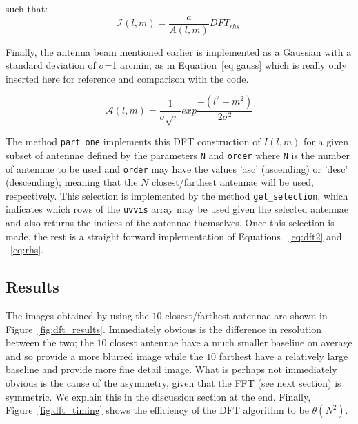 \documentclass[11pt,letterpaper]{article}
\begin{document}
such that:
\begin{equation}\label{eq:dft2}
\mathcal{I}(l,m)= \frac{a}{A(l,m)} DFT_{rhs} \,
\end{equation}

Finally, the antenna beam mentioned earlier is implemented as a Gaussian with a standard deviation of $\sigma$=1 arcmin, as in Equation~\ref{eq:gauss} which is really only inserted here for reference and comparison with the code.

\begin{equation}\label{eq:gauss}
\mathcal{A}(l,m)= \frac{1}{\sigma \sqrt{\pi}} exp{ \frac{-(l^{2} + m^{2})}{2 \sigma^{2}} }
\end{equation}

The method \texttt{part\_one} implements this DFT construction of $I(l,m)$ for a given subset of antennae defined by the parameters \texttt{N} and \texttt{order} where \texttt{N} is the number of antennae to be used and \texttt{order} may have the values 'asc' (ascending) or 'desc' (descending); meaning that the $N$ closest/farthest antennae will be used, respectively. This selection is implemented by the method \texttt{get\_selection}, which indicates which rows of the \texttt{uvvis} array may be used given the selected antennae and also returns the indices of the antennae themselves. Once this selection is made, the rest is a straight forward implementation of Equations ~\ref{eq:dft2} and ~\ref{eq:rhs}.

\subsection{Results}

The images obtained by using the $10$ closest/farthest antennae are shown in Figure~\ref{fig:dft_results}. Immediately obvious is the difference in resolution between the two; the $10$ closest antennae have a much smaller baseline on average and so provide a more blurred image while the $10$ farthest have a relatively large baseline and provide more fine detail image. What is perhaps not immediately obvious is the cause of the asymmetry, given that the FFT (see next section) is symmetric. We explain this in the discussion section at the end. Finally, Figure~\ref{fig:dft_timing} shows the efficiency of the DFT algorithm to be $\theta(N^{2})$.
\end{document}
